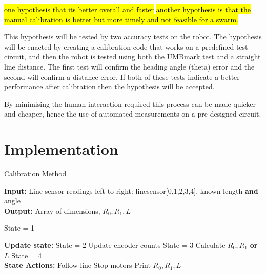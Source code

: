 \documentclass[conference]{IEEEtran}
\begin{document}
\hl{one hypothesis that its better overall and faster}
\hl{another hypothesis is that the manual calibration is better but more timely and not feasible for a swarm.}

This hypothesis will be tested by two accuracy tests on the robot. 
The hypothesis will be enacted by creating a calibration code that works on a predefined test circuit, and then the robot is tested using both the UMBmark test and a straight line distance. 
The first test will confirm the heading angle (theta) error and the second will confirm a distance error. 
If both of these tests indicate a better performance after calibration then the hypothesis will be accepted.

By minimising the human interaction required this process can be made quicker and cheaper, hence the use of automated measurements on a pre-designed circuit.

\section{Implementation}\label{sec:implementation}




\begin{algorithm}

\caption{Calibration Method} 
    \label{algo:calibration}
\textbf{Input:} Line sensor readings left to right:  linesensor[0,1,2,3,4], known length \textbf{and} angle \\
 \textbf{Output:} Array of dimensions, $R_0,R_1,L$\\

    \begin{algorithmic}
        \State State = 1
        
        \State \textbf{Update state:}
            \State State = 2
            \State Update encoder counts
            \State State = 3
            \State Calculate $R_0, R_1$ \textbf{or} $L$ 
            \State State = 4
        \EndIf\\
        
        \State \textbf{State Actions:}
            \State Follow line
            \State Stop motors
            \State Print $R_0,R_1,L$
        \EndIf
    \end{algorithmic}
\end{algorithm}
\end{document}
